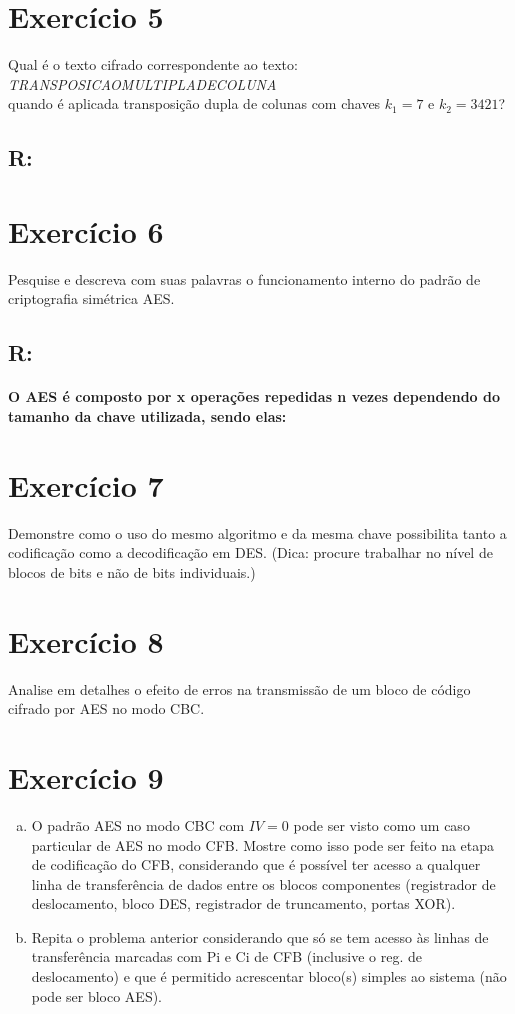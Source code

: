 \documentclass[10pt,a4paper]{article}
\begin{document}
\section*{Exercício 5}
Qual é o texto cifrado correspondente ao texto:\\ \emph{TRANSPOSICAOMULTIPLADECOLUNA}\\ quando é aplicada transposição dupla de colunas com chaves $k_1=7$ e $k_2= 3421$?
\subsection*{R:}
\section*{Exercício 6}
Pesquise e descreva com suas palavras o funcionamento interno do padrão de criptografia simétrica AES.
\subsection*{R:}
\paragraph*{O AES é composto por x operações repedidas n vezes dependendo do tamanho da chave utilizada, sendo elas:}
\section*{Exercício 7}
Demonstre como o uso do mesmo algoritmo e da mesma chave possibilita tanto a codificação como a decodificação em DES. (Dica: procure trabalhar no nível de blocos de bits e não de bits individuais.)
\section*{Exercício 8}
Analise em detalhes o efeito de erros na transmissão de um bloco de código cifrado por AES no modo CBC.
\section*{Exercício 9}
\begin{enumerate}[(a)]
\item O padrão AES no modo CBC com $IV=0$ pode ser visto como um caso particular de AES no modo CFB. Mostre como isso pode ser feito na etapa de codificação do CFB, considerando que é possível ter acesso a qualquer linha de transferência de dados entre os blocos componentes (registrador de deslocamento, bloco DES, registrador de truncamento, portas XOR).
\item Repita o problema anterior considerando que só se tem acesso às linhas de transferência marcadas com Pi e Ci de CFB (inclusive o reg. de deslocamento) e que é permitido acrescentar bloco(s) simples ao sistema (não pode ser bloco AES).
\end{enumerate}
\end{document}
